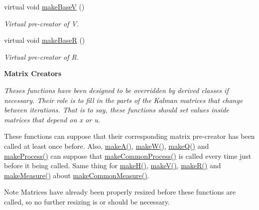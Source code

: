 \begin{Indent}
\begin{DoxyCompactItemize}
virtual void \mbox{\hyperlink{classKalman_1_1EKFilter_a72e6e032ae5db155eb7d1ba1401db9be}{make\+BaseV}} ()
\begin{DoxyCompactList}\small\item\em Virtual pre-\/creator of {\itshape V}. \end{DoxyCompactList}\item 
virtual void \mbox{\hyperlink{classKalman_1_1EKFilter_adaa2b05e931d64bf8f762812e06ce369}{make\+BaseR}} ()
\begin{DoxyCompactList}\small\item\em Virtual pre-\/creator of {\itshape R}. \end{DoxyCompactList}\end{DoxyCompactItemize}
\end{Indent}
\begin{Indent}\textbf{ Matrix Creators}\par
{\em Theses functions have been designed to be overridden by derived classes if necessary. Their role is to fill in the parts of the Kalman matrices that change between iterations. That is to say, these functions should set values inside matrices that depend on {\itshape x} or {\itshape u}.

These functions can suppose that their corresponding matrix pre-\/creator has been called at least once before. Also, {\ttfamily \mbox{\hyperlink{classKalman_1_1EKFilter_aa2cd9e16f121fe26802a133b4cb37f59}{make\+A()}}}, {\ttfamily \mbox{\hyperlink{classKalman_1_1EKFilter_ac0ea9285a523d219835f7ca2ce932902}{make\+W()}}}, {\ttfamily \mbox{\hyperlink{classKalman_1_1EKFilter_ab9765c4cbe0f67a1aa82ddfbc8173877}{make\+Q()}}} and {\ttfamily \mbox{\hyperlink{classKalman_1_1EKFilter_a778232d397d981c08b3ca23ea800aa6a}{make\+Process()}}} can suppose that {\ttfamily \mbox{\hyperlink{classKalman_1_1EKFilter_aace6f213340e7a0c78541454b13e8586}{make\+Common\+Process()}}} is called every time just before it being called. Same thing for {\ttfamily \mbox{\hyperlink{classKalman_1_1EKFilter_a357df3cc6833241d5430c58feaed14ed}{make\+H()}}}, {\ttfamily \mbox{\hyperlink{classKalman_1_1EKFilter_a70bb019d226cbf9858954b81c89392a7}{make\+V()}}}, {\ttfamily \mbox{\hyperlink{classKalman_1_1EKFilter_aff7a7f2d08673db1330e04e349b3bb8b}{make\+R()}}} and {\ttfamily \mbox{\hyperlink{classKalman_1_1EKFilter_aac9f6d80e5ec9e6ea2ccf045cb682df8}{make\+Measure()}}} about {\ttfamily \mbox{\hyperlink{classKalman_1_1EKFilter_a89337cacd8115338ffd34637f0ecbd92}{make\+Common\+Measure()}}}.

\begin{DoxyNote}{Note}
Matrices have already been properly resized before these functions are called, so no further resizing is or should be necessary. 


\end{DoxyNote}}
\end{Indent}
